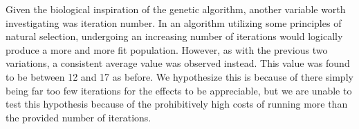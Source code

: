 \documentclass[12pt]{article}
\begin{document}
Given the biological inspiration of the genetic algorithm, another variable worth investigating was iteration number. In an algorithm utilizing some principles of natural selection, undergoing an increasing number of iterations would logically produce a more and more fit population. However, as with the previous two variations, a consistent average value was observed instead. This value was found to be between 12 and 17 as before. We hypothesize this is because of there simply being far too few iterations for the effects to be appreciable, but we are unable to test this hypothesis because of the prohibitively high costs of running more than the provided number of iterations.
\end{document}

